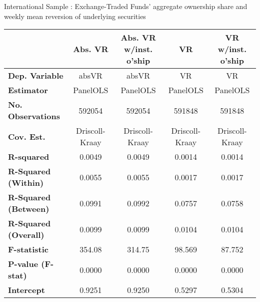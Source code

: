 \begin{center}
  \caption{International Sample : Exchange-Traded Funds' aggregate ownership share and weekly mean reversion of underlying securities}
  \label{tab:Efficiency:Intl:Comp}
  \begin{tabular}{lcccc}
    \toprule
    &  \textbf{Abs. VR}  & \textbf{Abs. VR w/inst. o'ship} &    \textbf{VR}     & \textbf{VR w/inst. o'ship}  \\
    \midrule
    \textbf{Dep. Variable}                     &       absVR        &              absVR              &         VR         &             VR              \\
    \textbf{Estimator}                         &      PanelOLS      &             PanelOLS            &      PanelOLS      &          PanelOLS           \\
    \textbf{No. Observations}                  &       592054       &              592054             &       591848       &           591848            \\
    \textbf{Cov. Est.}                         &   Driscoll-Kraay   &          Driscoll-Kraay         &   Driscoll-Kraay   &       Driscoll-Kraay        \\
    \textbf{R-squared}                         &       0.0049       &              0.0049             &       0.0014       &           0.0014            \\
    \textbf{R-Squared (Within)}                &       0.0055       &              0.0055             &       0.0017       &           0.0017            \\
    \textbf{R-Squared (Between)}               &       0.0991       &              0.0992             &       0.0757       &           0.0758            \\
    \textbf{R-Squared (Overall)}               &       0.0099       &              0.0099             &       0.0104       &           0.0104            \\
    \textbf{F-statistic}                       &       354.08       &              314.75             &       98.569       &           87.752            \\
    \textbf{P-value (F-stat)}                  &       0.0000       &              0.0000             &       0.0000       &           0.0000            \\
\midrule
    \textbf{Intercept}                         &       0.9251       &              0.9250             &       0.5297       &           0.5304            \\

\end{tabular}
\end{center}
